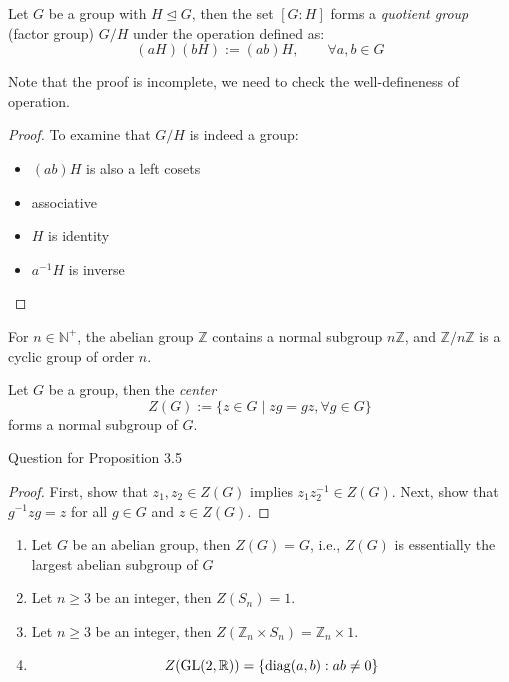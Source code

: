 \begin{theorem}
Let $G$ be a group with $H\trianglelefteq G$, then the set $[G:H]$ forms a \emph{quotient group} (factor group) $G/H$ under the operation defined as:
\[
(aH)(bH):=(ab)H,\qquad
\forall a,b\in G
\]
\end{theorem}
Note that the proof is incomplete, we need to check the well-defineness of operation.
\begin{proof}
To examine that $G/H$ is indeed a group:
\begin{itemize}
\item
$(ab)H$ is also a left cosets
\item
associative
\item
$H$ is identity
\item
$a^{-1}H$ is inverse
\end{itemize}
\end{proof}
\begin{example}
For $n\in\mathbb{N}^+$, the abelian group $\mathbb{Z}$ contains a normal subgroup $n\mathbb{Z}$, and $\mathbb{Z}/n\mathbb{Z}$ is a cyclic group of order $n$.
\end{example}
\begin{proposition}
Let $G$ be a group, then the \emph{center}
\[
Z(G):=\{z\in G\mid zg = gz,\forall g\in G\}
\]
forms a normal subgroup of $G$.
\end{proposition}
Question for Proposition 3.5
\begin{proof}
First, show that $z_1,z_2\in Z(G)$ implies $z_1z_2^{-1}\in Z(G)$. Next, show that $g^{-1}zg=z$ for all $g\in G$ and $z\in Z(G)$.
\end{proof}
\begin{example}
\begin{enumerate}
\item
Let $G$ be an abelian group, then $Z(G)=G$, i.e., $Z(G) $ is essentially the largest abelian subgroup of $G$
\item
Let $n\ge3$ be an integer, then $Z(S_n)=1$.
\item
Let $n\ge 3$ be an integer, then $Z(\mathbb{Z}_n\times S_n) = \mathbb{Z}_n\times 1$.
\item
\[
Z(\mbox{GL}(2,\mathbb{R}))=\{\operatorname{diag}(a,b):ab\ne0\}
\]
\end{enumerate}
\end{example}
